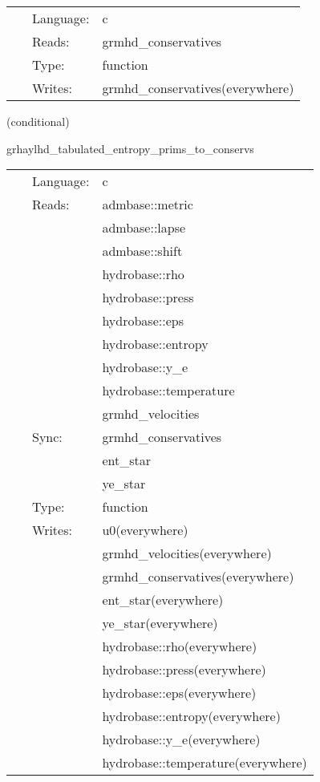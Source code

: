 \documentclass{article}
\begin{document}
\hspace{5mm}{\it hybrid version of grhaylhd\_perturb\_conservatives } 


\hspace{5mm}

 \begin{tabular*}{160mm}{cll} 
~ & Language:  & c \\ 
~ & Reads:  & grmhd\_conservatives \\ 
~ & Type:  & function \\ 
~ & Writes:  & grmhd\_conservatives(everywhere) \\ 
\end{tabular*} 


\vspace{5mm}

   (conditional) 

\hspace{5mm} grhaylhd\_tabulated\_entropy\_prims\_to\_conservs 

\hspace{5mm}{\it entropy+tabulated version of grhaylhd\_prims\_to\_conservs } 


\hspace{5mm}

 \begin{tabular*}{160mm}{cll} 
~ & Language:  & c \\ 
~ & Reads:  & admbase::metric \\ 
~& ~ &admbase::lapse\\ 
~& ~ &admbase::shift\\ 
~& ~ &hydrobase::rho\\ 
~& ~ &hydrobase::press\\ 
~& ~ &hydrobase::eps\\ 
~& ~ &hydrobase::entropy\\ 
~& ~ &hydrobase::y\_e\\ 
~& ~ &hydrobase::temperature\\ 
~& ~ &grmhd\_velocities\\ 
~ & Sync:  & grmhd\_conservatives \\ 
~& ~ &ent\_star\\ 
~& ~ &ye\_star\\ 
~ & Type:  & function \\ 
~ & Writes:  & u0(everywhere) \\ 
~& ~ &grmhd\_velocities(everywhere)\\ 
~& ~ &grmhd\_conservatives(everywhere)\\ 
~& ~ &ent\_star(everywhere)\\ 
~& ~ &ye\_star(everywhere)\\ 
~& ~ &hydrobase::rho(everywhere)\\ 
~& ~ &hydrobase::press(everywhere)\\ 
~& ~ &hydrobase::eps(everywhere)\\ 
~& ~ &hydrobase::entropy(everywhere)\\ 
~& ~ &hydrobase::y\_e(everywhere)\\ 
~& ~ &hydrobase::temperature(everywhere)\\ 
\end{tabular*} 
\end{document}
